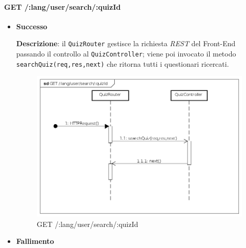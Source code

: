 \paragraph{GET /:lang/user/search/:quizId}
\begin{itemize}
\item \textbf{Successo}

\textbf{Descrizione}: il \texttt{QuizRouter} gestisce la richiesta \textit{REST} del Front-End passando il controllo al \texttt{QuizController}; viene poi invocato il metodo\\ \texttt{searchQuiz(req,res,next)} che ritorna tutti i questionari ricercati.

\begin{figure}[ht]
	\centering
	\includegraphics[scale=0.45]{UML/DiagrammiDiSequenza/Back-end/GET__lang_user_search__quizId.png}
	\caption{GET /:lang/user/search/:quizId}
\end{figure}
\FloatBarrier

\item \textbf{Fallimento}
\end{itemize}
